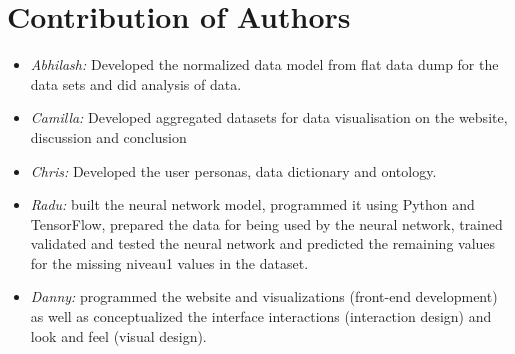 \section{Contribution of Authors}

\begin{itemize}
\item \textit{Abhilash:} Developed the normalized data model from flat data dump for the data sets and did analysis of data. 
\item \textit{Camilla:} Developed aggregated datasets for data visualisation on the website, discussion and conclusion
\item \textit{Chris:} Developed the user personas, data dictionary and ontology.
\item \textit{Radu:} built the neural network model, programmed it using Python and TensorFlow, prepared the data for being used by the neural network, trained validated and tested the neural network and predicted the remaining values for the missing niveau1 values in the dataset.
\item \textit{Danny:} programmed the website and visualizations (front-end development) as well as conceptualized the interface interactions (interaction design) and look and feel (visual design).
\end{itemize}
